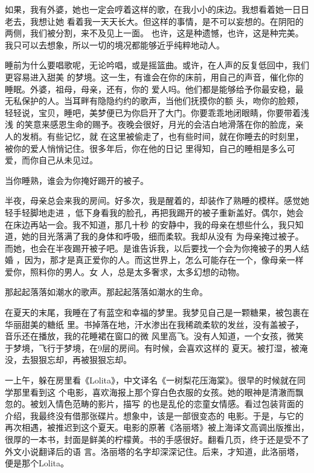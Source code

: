 \documentclass[12pt,a4paper]{article}
\begin{document}
		如果，我有外婆，她也一定会哼着这样的歌，在我小小的床边。我想看着她一日日老去，我想让她
	看着我一天天长大。但这样的事情，是不可以妄想的。在阴阳的两侧，我们被分割，来不及见上一面。
	也许，这是种遗憾，也许，这是种完美。我只可以去想象，所以一切的境况都能够近乎纯粹地动人。

		睡前为什么要唱歌呢，无论吟唱，或是摇篮曲。或许，在人声的反复低回中，我们更容易进入甜美
	的梦境。这一生，有谁会在你的床前，用自己的声音，催化你的睡眠。外婆，祖母，母亲，还有，你的
	爱人吗。他们都是能够给予你最安稳，最无私保护的人。当耳畔有隐隐约约的歌声，当他们抚摸你的额
	头，吻你的脸颊，轻轻说，宝贝，睡吧，美梦便已为你启开了大门。你要乖乖地闭眼睛，你要带着浅浅
	的笑意来感恩生命的赐予。夜晚会很好，月光的会洁白地滑落在你的脸庞，亲人的发梢。有些记忆，就
	在这里被偷走了，也有些时间，就在你睡去的时刻里，被你的爱人悄悄记住。很多年后，你在他的日记
	里得知，自己的睡相是多么可爱，而你自己从未见过。

		当你睡熟，谁会为你掩好踢开的被子。

		半夜，母亲总会来我的房间。好多次，我是醒着的，却装作了熟睡的模样。感觉她轻手轻脚地走进
	，低下身看我的脸孔，再把我踢开的被子重新盖好。偶尔，她会在床边再站一会。我不知道，那几十秒
	的安静中，我的母亲在想些什么，我只知道，她的目光落满了我的身体和呼吸，细而柔软。我却从没有
	为母亲掩过被子。而她，也会在半夜踢开被子吧。是谁告诉我，以后要找一个会为你掩被子的男人结婚
	，因为，那才是真正爱你的人。而这世界上，怎么可能存在一个，像母亲一样爱你，照料你的男人。女
	人，总是太多奢求，太多幻想的动物。

		那起起落落如潮水的歌声。那起起落落如潮水的生命。

		在夏天的末尾，我睡在了有蓝空和幸福的梦里。我梦见自己是一颗糖果，被包裹在华丽甜美的糖纸
	里。书掉落在地，汗水渗出在我稀疏柔软的发丝，没有盖被子，音乐还在播放，我的花睡裙在窗口的微
	风里高飞。没有人知道，一个女孩，微笑于梦境，飞行于梦境，在9层的房间。有时候，会喜欢这样的
	夏天。被打湿，被淹没，去狠狠忘却，再被狠狠忘却。

	\endwriting



		一上午，躲在房里看《Lolita》，中文译名《一树梨花压海棠》。很早的时候就在同学那里看到这
	个电影，喜欢海报上那个穿白色衣服的女孩。她的眼神是清澈而飘忽的。被划入情色范畴的影片，描写
	的也是乱伦的恋童女情感。看过包装背面的介绍，我最终没有借那张碟片。想象中，该是一部很变态的
	电影。于是，与它的再次相遇，被推迟到这个夏天。电影的原著《洛丽塔》被上海译文高调出版推出，
	很厚的一本书，封面是鲜美的柠檬黄。书的手感很好。翻看几页，终于还是受不了外文小说翻译后的语
	言。洛丽塔的名字却深深记住。后来，才知道，此洛丽塔，便是那个Lolita。
\end{document}
